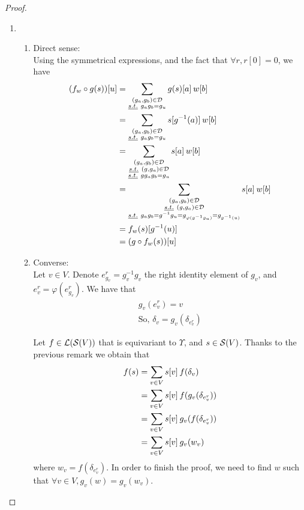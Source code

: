 \begin{proof}
\begin{enumerate}[label=(\roman*)]
   \item
  \begin{enumerate}
    \item Direct sense:\\
    Using the symmetrical expressions, and the fact that $\forall r, r[0] = 0$, we have
    \begin{align*}
    (f_w \circ g (s))[u] & = \displaystyle\sum_{\substack{(g_a,g_b) \in \cd\\ \st g_ag_b = g_u}} g(s)[a] \h{2} w[b]\\
    				& = \displaystyle\sum_{\substack{(g_a,g_b) \in \cd\\ \st g_ag_b = g_u}} s[g^{-1}(a)] \h{2} w[b]\\
    				& = \displaystyle\sum_{\substack{(g_a,g_b) \in \cd\\ \st (g, g_a) \in \cd\\ \st gg_ag_b = g_u}} s[a] \h{2} w[b]\\
    				& = \displaystyle\sum_{\substack{(g_a,g_b) \in \cd\\ \st (g, g_a) \in \cd\\ \st g_ag_b = g^{-1}g_u = g_{\varphi(g^{-1}g_u)} = g_{g^{-1}(u)} }} s[a] \h{2} w[b]\\
    				& = f_w (s)[g^{-1}(u)]\\
    				& = (g \circ f_w (s))[u]
    \end{align*}

    \item Converse:\\
    Let $v \in V$. Denote $e^r_{g_v} = g_v^{-1}g_v$ the right identity element of $g_v$, and $e^r_v = \varphi(e^r_{g_v})$. We have that
    \begin{gather*}
    g_v(e^r_v) = v\\
    \text{So, } \delta_v = g_v(\delta_{e^r_v})
    \end{gather*}

    Let $f \in \cl(\cs(V))$ that is equivariant to $\Upsilon$, and $s \in \cs(V)$. Thanks to the previous remark we obtain that
    \begin{align}
    f(s) & = \displaystyle\sum_{v \in V} s[v] \h{2} f(\delta_v)\nonumber\\
         & = \displaystyle\sum_{v \in V} s[v] \h{2} f(g_v(\delta_{e^r_v}))\nonumber\\
         & = \displaystyle\sum_{v \in V} s[v] \h{2} g_v(f(\delta_{e^r_v}))\nonumber\\
         & = \displaystyle\sum_{v \in V} s[v] \h{2} g_v(w_v) \label{eq:last}
    \end{align}
    where $w_v = f(\delta_{e^r_v})$. In order to finish the proof, we need to find $w$ such that $\forall v \in V, g_v(w) = g_v(w_v)$.


\end{enumerate}
\end{enumerate}
\end{proof}

